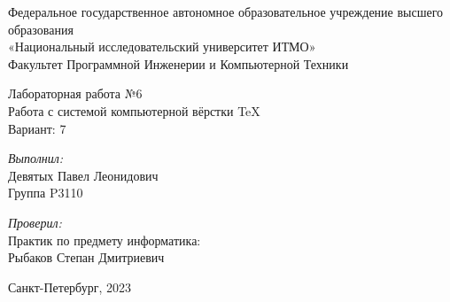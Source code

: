 \documentclass[12pt, a4paper]{article}
\begin{document}
\begin{center}
\Large Федеральное государственное автономное образовательное учреждение высшего образования\\ «Национальный исследовательский университет ИТМО»\\
Факультет Программной Инженерии и Компьютерной Техники\\
\hfill 


\vspace{7cm}
\Large Лабораторная работа №6 \\
Работа с системой компьютерной вёрстки \TeX\\
Вариант: 7\\
\end{center}

\vspace{7.5cm}
 
\begin{flushright}
\textit{Выполнил:}\\
Девятых Павел Леонидович\\
Группа P3110\

\textit{Проверил:}\\
Практик по предмету информатика:\\
Рыбаков Степан Дмитриевич\\
\end{flushright}
 
\vfill

\begin{center} Санкт-Петербург, 2023 \end{center}
\end{document}
